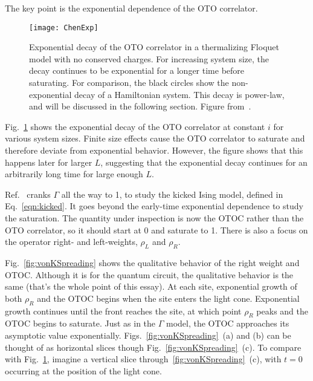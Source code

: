 \documentclass[a4paper,11pt]{article}
\begin{document}
The key point is the exponential dependence of the OTO correlator. 
\begin{figure}
	\centering
	\texttt{[image: ChenExp]}
	\caption{Exponential decay of the OTO correlator in a thermalizing Floquet model with no conserved charges. For increasing system size, the decay continues to be exponential for a longer time before saturating. For comparison, the black circles show the non-exponential decay of a Hamiltonian system. This decay is power-law, and will be discussed in the following section. Figure from~\cite{ChenOtoc}.}
	\label{fig:ChenExp}
\end{figure}
Fig.~\ref{fig:ChenExp} shows the exponential decay of the OTO correlator at constant $i$ for various system sizes. Finite size effects cause the OTO correlator to saturate and therefore deviate from exponential behavior. However, the figure shows that this happens later for larger $L$, suggesting that the exponential decay continues for an arbitrarily long time for large enough $L$.

Ref.~\cite{vonKeyserlingkHydro} cranks $\Gamma$ all the way to 1, to study the kicked Ising model, defined in Eq.~\ref{eqn:kicked}. It goes beyond the early-time exponential dependence to study the saturation. The quantity under inspection is now the OTOC rather than the OTO correlator, so it should start at 0 and saturate to 1. There is also a focus on the operator right- and left-weights, $\rho_L$ and $\rho_R$.

Fig.~\ref{fig:vonKSpreading} shows the qualitative behavior of the right weight and OTOC. Although it is for the quantum circuit, the qualitative behavior is the same (that's the whole point of this essay). At each site, exponential growth of both $\rho_R$ and the OTOC begins when the site enters the light cone. Exponential growth continues until the front reaches the site, at which point $\rho_R$ peaks and the OTOC begins to saturate. Just as in the $\Gamma$ model, the OTOC approaches its asymptotic value exponentially. 
Figs.~\ref{fig:vonKSpreading}~(a) and (b) can be thought of as horizontal slices though Fig.~\ref{fig:vonKSpreading}~(c). To compare with Fig.~\ref{fig:ChenExp}, imagine a vertical slice through~\ref{fig:vonKSpreading}~(c), with $t=0$ occurring at the position of the light cone.
\end{document}
